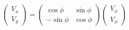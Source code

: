 \begin{align}
\begin{aligned}
	\left(
	\begin{array}{c}
	 	V_x \\
	 	V_y
	\end{array}
	\right)
	=
	\left(
	\begin{array}{cc}
	 	\cos{\phi} & \sin{\phi}\\
	 	-\sin{\phi} & \cos{\phi}
	\end{array}
	\right)
	\left(
	\begin{array}{cc}
	 	V_{\phi} \\
	 	V_{\phi}
	\end{array}
	\right)
\end{aligned}
\end{align}




